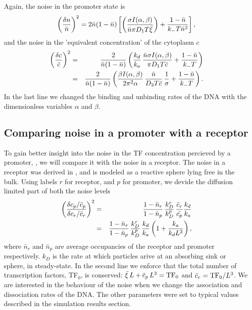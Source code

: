 Again, the noise in the promoter state is
\begin{equation}
 \elabel{NoiseProFull}
 \left( \frac{\delta n}{\bar{n}} \right)^2 = 2 \bar{n}(1-\bar{n})\left[\left( \frac{\sigma I(\alpha,\beta)}{\bar{n} \pi D_1 T \bar{\xi}} \right)+\frac{1-\bar{n}}{k_- T \bar{n}^2} \right],
\end{equation}
and the noise in the 'equivalent concentration' of the cytoplasm $c$
\begin{eqnarray}
 \elabel{NoiseCFull} 
 \left( \frac{\delta c}{\bar{c}} \right)^2 & = & \frac{2}{\bar{n}(1-\bar{n})} \left( \frac{k_d}{k_a} \, \frac{\bar{n} \sigma I(\alpha,\beta)}{\pi D_1 T \bar{c}} + \frac{1-\bar{n}}{k_- T}  \right) \\
 \elabel{NoiseCFull2}
 & = & \frac{2}{\bar{n}(1-\bar{n})} \left( \frac{\beta I(\alpha,\beta)}{2 \pi^2 \alpha} \, \frac{\bar{n}}{D_3 T \bar{c}} \, \frac{1}{\sigma} + \frac{1-\bar{n}}{k_- T}  \right).
\end{eqnarray}
In the last line we changed the binding and unbinding rates of the DNA with the dimensionless variables $\alpha$ and $\beta$.


\subsection{Comparing noise in a promoter with a receptor}
To gain better insight into the noise in the TF concentration percieved by a promoter, , we will compare it with the noise in a receptor. The noise in a receptor was derived in \cite{DeRonde2012}, and is modeled as a reactive sphere lying free in the bulk. Using labels $r$ for receptor, and $p$ for promoter, we devide the diffusion limited part of both the noise levels
\begin{eqnarray}
 \left( \frac{\delta c_p / \bar{c}_p}{\delta c_r / \bar{c}_r} \right)^2 & = & \frac{1-\bar{n}_r}{1-\bar{n}_p} \, \frac{k_D^r}{k_D^p} \, \frac{\bar{c}_r}{\bar{c_p}} \frac{k_d}{k_a} \\
 & = & \frac{1-\bar{n}_r}{1-\bar{n}_p} \, \frac{k_D^r}{k_D^p} \, \frac{k_d}{k_a} \left( 1 + \frac{k_a}{k_d L^2}\right),
 \elabel{NoiseCmpA}
\end{eqnarray}
where $\bar{n}_r$ and $\bar{n}_p$ are average occupancies of the receptor and promoter respectively. $k_D$ is the rate at which particles arive at an absorbing sink or sphere, in steady-state. In the second line we enforce that the total number of transcription factors, TF$_0$, is conserved: $\bar{\xi} \, L + \bar{c}_p \, L^3 = {\rm TF}_0$ and $\bar{c}_r = {\rm TF}_0/L^3$. We are interested in the behaviour of the noise when we change the association and dissociation rates of the DNA. The other parameters were set to typical values described in the simulation results section. 


